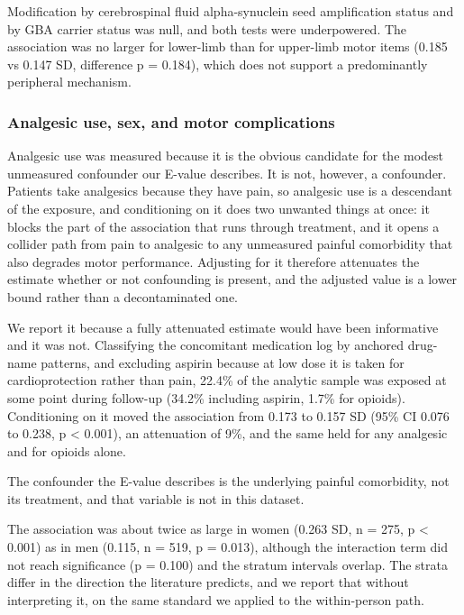 \documentclass[
  english,
  12pt,
]{article}
\begin{document}
Modification by cerebrospinal fluid alpha-synuclein seed amplification status and by GBA carrier status was null, and both tests were underpowered. The association was no larger for lower-limb than for upper-limb motor items (0.185 vs 0.147 SD, difference p = 0.184), which does not support a predominantly peripheral mechanism.

\subsubsection{Analgesic use, sex, and motor complications}\label{analgesic-use-sex-and-motor-complications}

Analgesic use was measured because it is the obvious candidate for the modest unmeasured confounder our E-value describes. It is not, however, a confounder. Patients take analgesics because they have pain, so analgesic use is a descendant of the exposure, and conditioning on it does two unwanted things at once: it blocks the part of the association that runs through treatment, and it opens a collider path from pain to analgesic to any unmeasured painful comorbidity that also degrades motor performance. Adjusting for it therefore attenuates the estimate whether or not confounding is present, and the adjusted value is a lower bound rather than a decontaminated one.

We report it because a fully attenuated estimate would have been informative and it was not. Classifying the concomitant medication log by anchored drug-name patterns, and excluding aspirin because at low dose it is taken for cardioprotection rather than pain, 22.4\% of the analytic sample was exposed at some point during follow-up (34.2\% including aspirin, 1.7\% for opioids). Conditioning on it moved the association from 0.173 to 0.157 SD (95\% CI 0.076 to 0.238, p \textless{} 0.001), an attenuation of 9\%, and the same held for any analgesic and for opioids alone.

The confounder the E-value describes is the underlying painful comorbidity, not its treatment, and that variable is not in this dataset.

The association was about twice as large in women (0.263 SD, n = 275, p \textless{} 0.001) as in men (0.115, n = 519, p = 0.013), although the interaction term did not reach significance (p = 0.100) and the stratum intervals overlap. The strata differ in the direction the literature predicts, and we report that without interpreting it, on the same standard we applied to the within-person path.
\end{document}
